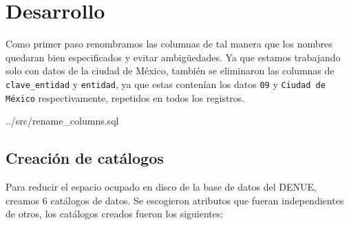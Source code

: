 \documentclass{article}
\begin{document}
\section{Desarrollo}
Como primer paso renombramos las columnas de tal manera que los nombres quedaran
bien especificados y evitar ambigüedades. Ya que estamos trabajando solo con
datos de la ciudad de México, también se eliminaron las columnas de
\texttt{clave\_entidad} y \texttt{entidad}, ya que estas contenían los datos
\texttt{09} y \texttt{Ciudad de México} respectivamente, repetidos en todos los
registros.


{../src/rename_columns.sql}

\subsection{Creación de catálogos}
Para reducir el espacio ocupado en disco de la base de datos del DENUE, creamos
6 catálogos de datos. Se escogieron atributos que fueran independientes de
otros, los catálogos creados fueron los siguientes:
\end{document}
